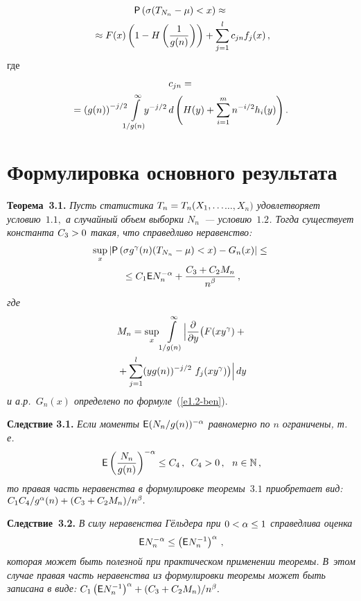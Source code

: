\begin{multicols}{2}
\noindent
\begin{multline*}
{{\sf P}}\left(\sigma (T_{N_n}  -  \mu)  <  x\right) \approx {}\\
{}\approx  F(x)\left(1 -
H\left(\displaystyle\frac{\displaystyle 1\mathstrut}{\displaystyle g(n)\mathstrut}\right)\right) + \sum\limits_{j=1}^l c_{jn} f_j(x)\,,
\end{multline*}
где
\begin{multline*}
c_{jn} = {}\\
\hspace*{-4pt}{}=\left(g(n)\right)^{-j/2} \!\!\!\int\limits_{1/g(n)}^\infty\!\!\!
y^{-j/2} \,d \left(H(y) + \sum\limits_{i=1}^m n^{-i/2} h_i(y)\right).
\end{multline*}

\section {Формулировка основного результата}

\noindent
\textbf{Теорема~3.1.} \textit{Пусть  статистика
$T_n\hm=T_n(X_1,\ldots$\linebreak $\ldots ,X_n)$ удовлетворяет условию~$1.1,$ а случайный
объем выборки $N_n$~--- условию~$1.2$. Тогда  существует константа
$C_3\hm>0$ такая, что справедливо неравенство:
\begin{multline*}
\sup\limits_x \left| {\sf P}\left(\sigma g^\gamma(n)(T_{N_n}  -  \mu) < x\right)
-  G_n(x)\right| \leq {}\\
{}\leq C_1 {\sf E} N_n^{-\alpha} + \displaystyle\frac{\displaystyle C_3 + C_2
M_n\mathstrut}{\displaystyle n^\beta\mathstrut}\,,
\end{multline*}
где
\begin{multline*}
M_n = \sup_x \int\limits_{1/g(n)}^\infty
\Bigl|\displaystyle\frac{\displaystyle \partial\mathstrut}{\displaystyle \partial y\mathstrut} \bigl(F(xy^\gamma) +{}\\
{}+ \sum_{j=1}^l
(yg(n))^{-j/2}\ f_j(xy^\gamma)\bigr)\Bigr|\, dy
\end{multline*}
и а.р.\ $G_n(x)$ определено по формуле}~(\ref{e1.2-ben}).

\smallskip

\noindent
\textbf{Следствие 3.1.} \textit{Если моменты ${\sf E} (N_n/g(n))^{-\alpha}$
равномерно по $n$ ограничены, т.\,е.\
$$
{\sf E} \left(\displaystyle\frac{\displaystyle N_n\mathstrut}{\displaystyle g(n)\mathstrut}\right)^{-\alpha} \leq C_4\,,  \enskip C_4 >
0\,,\ \ n \in \mathbb N\,,
$$
то правая часть неравенства в формулировке теоремы~$3.1$ приобретает
вид:}
$
{C_1 C_4}/{g^\alpha(n)} \hm+  (C_3 \hm+ C_2 M_n)/{n^\beta}.
$


\smallskip

\noindent
\textbf{Следствие~3.2.} \textit{В силу неравенства Гёльдера при
$0\hm<\alpha\hm\leq1$ справедлива оценка
$$
{\sf E} N_n^{-\alpha} \leq \left({\sf E} N_n^{-1}\right)^\alpha\,,
$$
которая может быть полезной при практическом применении теоремы. 
В~этом случае правая часть неравенства из формулировки теоремы может
быть записана в виде:}
$
C_1 \left({\sf E} N_n^{-1}\right)^\alpha  +  ({C_3 + C_2
M_n})/{n^\beta}.
$



\end{multicols}

